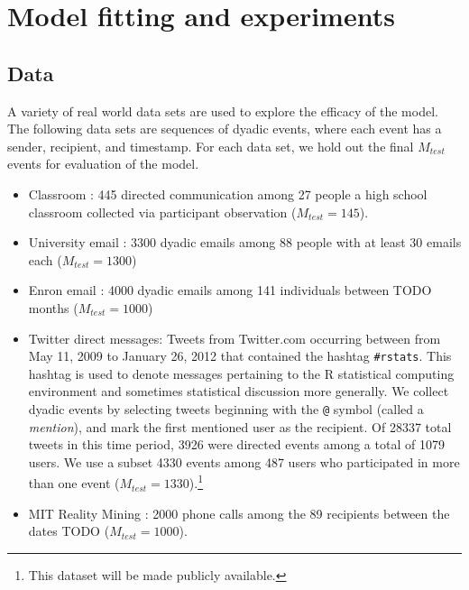 \section{Model fitting and experiments}
\label{sec:experiments}

\subsection{Data}

A variety of real world data sets are used to explore the efficacy of the model.  The following data sets are sequences of dyadic events, where each event has a sender, recipient, and timestamp.  For each data set, we hold out the final $M_{test}$ events for evaluation of the model.

\begin{itemize}
\item Classroom \cite{McFarland2001}: 445 directed communication among 27 people a high
  school classroom collected via participant observation ($M_{test}= 145$).
\item University email \cite{Eckmann2004}: 3300 dyadic emails among 88 people with at least 30
  emails each ($M_{test} = 1300$)
\item Enron email \cite{Klimt2004}: 4000 dyadic emails among 141
  individuals between TODO months ($M_{test} = 1000$)
\item Twitter direct messages: Tweets from Twitter.com occurring between from May 11, 2009 to January 26, 2012 that contained the hashtag \texttt{\#rstats}.  This hashtag is used to denote messages pertaining to the R statistical computing environment and sometimes statistical discussion more generally.  We collect dyadic events by selecting tweets beginning with the \texttt{@} symbol (called a \emph{mention}), and mark the first mentioned user as the recipient.
Of 28337 total tweets in this time period, 3926 were directed events among a total of 1079 users.
We use a subset 4330 events among 487 users who participated in more than one event ($M_{test} = 1330$).\footnote{This dataset will be made publicly available.}
\item MIT Reality Mining \cite{Eagle2009}: 2000 phone calls among the 89 recipients between the dates TODO ($M_{test}= 1000$).
\end{itemize}

